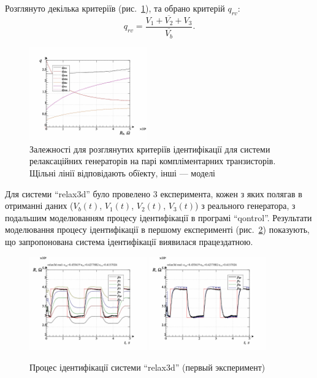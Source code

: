 \documentclass[a4paper,13pt]{atuaref}
\begin{document}
Розглянуто декілька критеріїв (рис.~\ref{atu:f:relax3d_q}), та обрано критерій $q_{rv}$:
%
\begin{equation}
  q_{rv} = \frac{\overline{V_1+V_2+V_3}}{\overline{V_b}}.
  \label{atu:eq:q_rv_relax}
\end{equation}

\begin{figure}[htb!]
  \centerline{\includegraphics[width=0.45\textwidth]{p7/p/relax3d_read_q-p_q1.png} }
  \caption{Залежності для розглянутих критеріїв ідентифікації для системи
  релаксаційних генераторів на парі компліментарних транзисторів.
  Щільні лінії відповідають обїекту, інші --- моделі}
  \label{atu:f:relax3d_q}
\end{figure}

Для системи ``relax3d'' було провелено 3 експеримента, кожен з яких полягав в отриманні даних
($ V_b (t) $, $ V_1 (t) $, $ V_2 (t) $, $ V_3(t) $) з реального генератора, з подальшим моделюванням процесу ідентифікації в
програмі ``qontrol''.
Результати моделювання процесу ідентифікації в першому експерименті
(рис.~\ref{atu:f:relax3d_id_1}) показують, що запропонована система
ідентифікації виявилася працездатною.

\begin{figure}[htb!]
  \centerline{
    \includegraphics[width=0.45\textwidth]{p7/p/relax3d_read_id2-p_p_00.png}
    \hfill
    \includegraphics[width=0.45\textwidth]{p7/p/relax3d_read_id2-p_pp_00.png}
  }
  \caption{Процес ідентифікації системи ``relax3d'' (первый эксперимент)}
  \label{atu:f:relax3d_id_1}
\end{figure}
\end{document}
